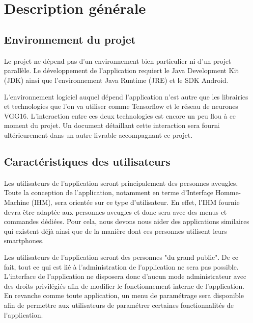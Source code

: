 \documentclass[CDS,UTF8,final]{EPURapport}
\begin{document}
\section{Description générale}
\subsection{Environnement du projet}
\paragraph{}
Le projet ne dépend pas d'un environnement bien particulier ni d'un projet parallèle. Le développement de l'application requiert le Java Development Kit (JDK) ainsi que l'environnement Java Runtime (JRE) et le SDK Android.\par

L'environnement logiciel auquel dépend l'application n'est autre que les librairies et technologies que l'on va utiliser comme Tensorflow et le réseau de neurones VGG16. L'interaction entre ces deux technologies est encore un peu flou à ce moment du projet. Un document détaillant cette interaction sera fourni ultérieurement dans un autre livrable accompagnant ce projet.

\subsection{Caractéristiques des utilisateurs}
\paragraph{}
Les utilisateurs de l'application seront principalement des personnes aveugles. Toute la conception de l'application, notamment en terme d'Interfaçe Homme-Machine (IHM), sera orientée sur ce type d'utilisateur. En effet, l'IHM fournie devra être adaptée aux personnes aveugles et donc sera avec des menus et commandes dédiées. Pour cela, nous devons nous aider des applications similaires qui existent déjà ainsi que de la manière dont ces personnes utilisent leurs smartphones.\par

Les utilisateurs de l'application seront des personnes "du grand public". De ce fait, tout ce qui est lié à l'administration de l'application ne sera pas possible. L'interface de l'application ne disposera donc d'aucun mode administrateur avec des droits privilégiés afin de modifier le fonctionnement interne de l'application. En revanche comme toute application, un menu de paramétrage sera disponible afin de permettre aux utilisateurs de paramétrer certaines fonctionnalités de l'application. 
\end{document}
